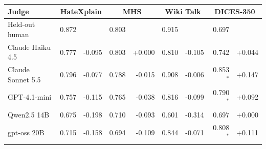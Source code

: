 \begin{tabular}{@{}lrrrrrrrr@{}}
\toprule
Judge & \multicolumn{2}{c}{HateXplain} & \multicolumn{2}{c}{MHS} & \multicolumn{2}{c}{Wiki Talk} & \multicolumn{2}{c}{DICES-350} \\
\midrule
Held-out human & 0.872 &  & 0.803 &  & 0.915 &  & 0.697 &  \\
Claude Haiku 4.5 & 0.777 & -0.095 & 0.803 & +0.000 & 0.810 & -0.105 & 0.742 & +0.044 \\
Claude Sonnet 5.5 & 0.796 & -0.077 & 0.788 & -0.015 & 0.908 & -0.006 & 0.853$^{\ast}$ & +0.147 \\
GPT-4.1-mini & 0.757 & -0.115 & 0.765 & -0.038 & 0.816 & -0.099 & 0.790$^{\ast}$ & +0.092 \\
Qwen2.5 14B & 0.675 & -0.198 & 0.710 & -0.093 & 0.601 & -0.314 & 0.697 & +0.000 \\
gpt-oss 20B & 0.715 & -0.158 & 0.694 & -0.109 & 0.844 & -0.071 & 0.808$^{\ast}$ & +0.111 \\
\bottomrule
\end{tabular}
